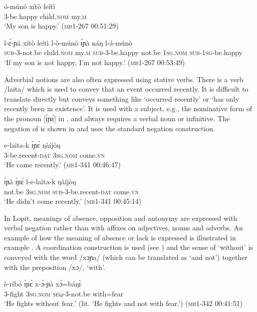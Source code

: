 \documentclass[output=paper,colorlinks,citecolor=brown,draftmode]{langscibook}
\begin{document}
\ea\label{ex:lop:85}
        \gll ó-múnó xítò leítì \\ 
             3-be.happy child.\textsc{nom} my.\textsc{m} \\
        \glt ‘My son is happy.’   (\textsc{mb1-267} 00:51:29)
\z

\ea\label{ex:lop:86}
        \gll l-ɛ́-ɲá xítò leítì  l-ò-múnò ɪ́ɲà náŋ l-á-múnò \\ 
             \textsc{sub-3-}not.be child.\textsc{nom} my.\textsc{m} \textsc{sub-3-}be.happy not.be 1\textsc{sg.nom} \textsc{sub-1sg-}be.happy \\
        \glt ‘If my son is not happy, I'm not happy.’   (\textsc{mb1-267} 00:53:49)
\z

Adverbial notions are also often expressed using stative verbs. There is a verb /laita/ which is used to convey that an event occurred recently. It is difficult to translate directly but conveys something like ‘occurred recently’ or ‘has only recently been in existence’. It is used with a subject, e.g., the nominative form of the pronoun [ɪ́ɲɛ́] in , and always requires a verbal noun or infinitive.  The negation of  is shown in  and uses the standard negation construction.

\ea\label{ex:lop:87}
        \gll e-laita-k ɪ́ɲɛ́ ŋàíjòŋ     \\ 
             3-be.recent-\textsc{dat} 3\textsc{sg.nom} come\textsc{.vn} \\
        \glt ‘He came recently.’ (\textsc{mb1-341} 00:46:47)
\z

\ea\label{ex:lop:88}
        \gll ɪ́ɲà ɪ́ɲɛ́ l-e-laita-k ŋàíjòŋ \\ 
             not.be 3\textsc{sg.nom} \textsc{sub-}3-be.recent-\textsc{dat} come\textsc{.vn} \\
        \glt ‘He didn't come recently.’ (\textsc{mb1-341} 00:45:14)
\z

In Lopit, meanings of absence, opposition and antonymy are expressed with verbal negation rather than with affixes on adjectives, nouns and adverbs.  An example of how the meaning of absence or lack is expressed is illustrated in example . A coordination construction is used (see ) and the sense of ‘without’ is conveyed with the word /xɔɲa/ (which can be translated as ‘and not’) together with the preposition /xɔ/, ‘with’.

\ea\label{ex:lop:89}
        \gll è-ríbó ɪ́ɲɛ́ x-ɔ̀-ɲà xɔ̀=báŋɪ́ \\ 
             3-fight 3\textsc{sg.nom} \textsc{seq}{}-3-not.be with=fear \\
        \glt ‘He fights without fear.’ (lit. ‘He fights and not with fear.’) (\textsc{mb1-342} 00:41:51)
\z
\end{document}
